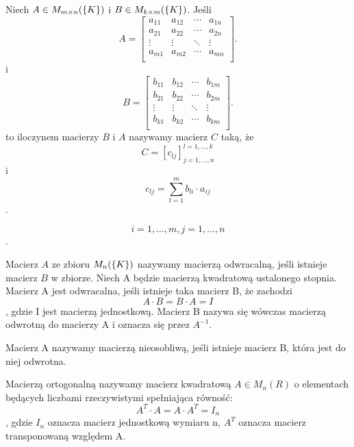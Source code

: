 \documentclass[10pt,a4paper]{report}
\newcommand{\mx}[1]{{#1}}
\begin{document}
\begin{definition}
Niech $\mx{A}\in \mx{M}_{m\times n}(\set{K})$ i $\mx{B}\in \mx{M}_{k\times m}(\set{K})$. Jeśli
$$
\mx{A} = \begin{bmatrix}
 a_{11} & a_{12} & \cdots & a_{1n} \\
         a_{21} & a_{22} & \cdots & a_{2n} \\
         \vdots & \vdots & \ddots & \vdots \\
         a_{m1} & a_{m2} & \cdots & a_{mn} \\
\end{bmatrix}.
$$ 
i 
$$
\mx{B} = \begin{bmatrix}
 b_{11} & b_{12} & \cdots & b_{1m} \\
         b_{21} & b_{22} & \cdots & b_{2m} \\
         \vdots & \vdots & \ddots & \vdots \\
         b_{k1} & b_{k2} & \cdots & b_{km} \\
\end{bmatrix}.
$$
to iloczynem macierzy $\mx{B}$ i $\mx{A}$ nazywamy macierz $\mx{C}$ taką, że
$$
\mx{C} = [c_{lj}]_{j=1,\ldots,n}^{l=1,\ldots,k}
$$
i
$$
c_{lj}= \sum_{l=1}^{m} b_{li} \cdot a_{ij}
$$.
\end{definition}

$$
i=1,\ldots,m, j=1,\ldots,n 
$$.


\begin{definition}
Macierz $\mx{A}$ ze zbioru $\mx{M}_{n}(\set{K})$ nazywamy macierzą odwracalną, jeśli istnieje macierz $\mx{B}$ w zbiorze.
Niech A będzie macierzą kwadratową ustalonego stopnia. Macierz A jest odwracalna, jeśli istnieje taka macierz B, że zachodzi
$$
A\cdot B=B\cdot A=I
$$, 
gdzie I jest macierzą jednostkową. Macierz B nazywa się wówczas macierzą odwrotną do macierzy A i oznacza się przez  $A^{-1}.$
\end{definition}

\begin{definition}
Macierz A nazywamy macierzą nieosobliwą, jeśli istnieje macierz B, która jest do niej odwrotna.
\end{definition}  

\begin{definition}
Macierzą ortogonalną nazywamy macierz kwadratową $A\in M_{n}(R)$ o elementach będących liczbami rzeczywistymi spełniająca równość:
$$
A^{T}\cdot A=A\cdot A^{T}=I_{n}
$$, 
gdzie $I_{n}$ oznacza macierz jednostkową wymiaru n, $A^{T}$ oznacza macierz transponowaną względem A.
\end{definition}
\end{document}
